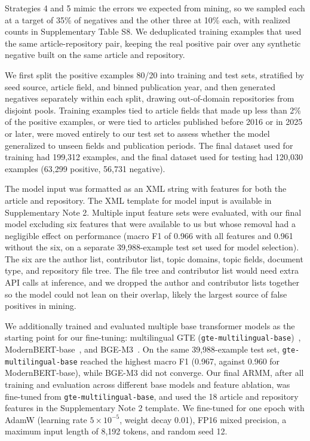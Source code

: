 \documentclass[pdflatex,sn-nature]{sn-jnl}%
\begin{document}
\noindent Strategies 4 and 5 mimic the errors we expected from mining, so we sampled each at a target of 35\% of negatives and the other three at 10\% each, with realized counts in Supplementary Table S8.
We deduplicated training examples that used the same article-repository pair, keeping the real positive pair over any synthetic negative built on the same article and repository.

We first split the positive examples 80/20 into training and test sets, stratified by seed source, article field, and binned publication year, and then generated negatives separately within each split, drawing out-of-domain repositories from disjoint pools.
Training examples tied to article fields that made up less than 2\% of the positive examples, or were tied to articles published before 2016 or in 2025 or later, were moved entirely to our test set to assess whether the model generalized to unseen fields and publication periods.
The final dataset used for training had 199,312 examples, and the final dataset used for testing had 120,030 examples (63,299 positive, 56,731 negative).

The model input was formatted as an XML string with features for both the article and repository.
The XML template for model input is available in Supplementary Note 2.
Multiple input feature sets were evaluated, with our final model excluding six features that were available to us but whose removal had a negligible effect on performance (macro F1 of 0.966 with all features and 0.961 without the six, on a separate 39,988-example test set used for model selection).
The six are the author list, contributor list, topic domains, topic fields, document type, and repository file tree.
The file tree and contributor list would need extra API calls at inference, and we dropped the author and contributor lists together so the model could not lean on their overlap, likely the largest source of false positives in mining.

We additionally trained and evaluated multiple base transformer models as the starting point for our fine-tuning: multilingual GTE (\texttt{gte-multilingual-base})~\cite{zhang2024mgte}, ModernBERT-base~\cite{warner2025smarter}, and BGE-M3~\cite{chen2024m3}.
On the same 39,988-example test set, \texttt{gte-multilingual-base} reached the highest macro F1 (0.967, against 0.960 for ModernBERT-base), while BGE-M3 did not converge.
Our final ARMM, after all training and evaluation across different base models and feature ablation, was fine-tuned from \texttt{gte-multilingual-base}, and used the 18 article and repository features in the Supplementary Note 2 template.
We fine-tuned for one epoch with AdamW (learning rate $5\times10^{-5}$, weight decay 0.01), FP16 mixed precision, a maximum input length of 8,192 tokens, and random seed 12.
\end{document}
